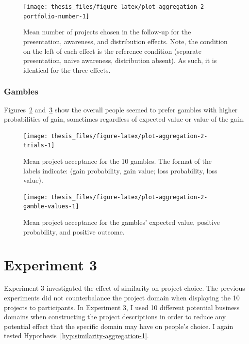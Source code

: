 \documentclass[a4paper, nobind, dvipsnames]{templates/ociamthesis}
\theoremstyle{definition}
\theoremstyle{definition}
\theoremstyle{definition}
\theoremstyle{definition}
\theoremstyle{remark}
\begin{document}
\begin{figure}
\texttt{[image: thesis\_files/figure-latex/plot-aggregation-2-portfolio-number-1]} \caption{Mean number of projects chosen in the follow-up for the presentation, awareness, and distribution effects. Note, the condition on the left of each effect is the reference condition (separate presentation, naive awareness, distribution absent). As such, it is identical for the three effects.}\label{fig:plot-aggregation-2-portfolio-number}
\end{figure}

\subsubsection{Gambles}

Figures~\ref{fig:plot-aggregation-2-trials}
and~\ref{fig:plot-aggregation-2-gamble-values} show the overall people seemed
to prefer gambles with higher probabilities of gain, sometimes regardless of
expected value or value of the gain.



\begin{figure}
\texttt{[image: thesis\_files/figure-latex/plot-aggregation-2-trials-1]} \caption{Mean project acceptance for the 10 gambles. The format of the labels indicate: (gain probability, gain value; loss probability, loss value).}\label{fig:plot-aggregation-2-trials}
\end{figure}



\begin{figure}
\texttt{[image: thesis\_files/figure-latex/plot-aggregation-2-gamble-values-1]} \caption{Mean project acceptance for the gambles' expected value, positive probability, and positive outcome.}\label{fig:plot-aggregation-2-gamble-values}
\end{figure}

\hypertarget{aggregation-3}{%
\section{Experiment 3}\label{aggregation-3}}

Experiment 3 investigated the effect of similarity on project choice. The
previous experiments did not counterbalance the project domain when displaying
the 10 projects to participants. In Experiment 3, I used 10 different potential
business domains when constructing the project descriptions in order to reduce
any potential effect that the specific domain may have on people's choice. I
again tested Hypothesis~\ref{hyp:similarity-aggregation-1}.
\end{document}
